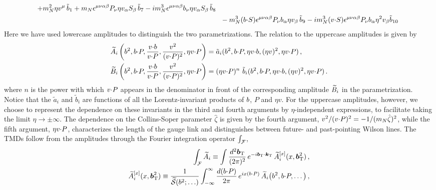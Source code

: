\begin{widetext}
\begin{align}
		~~+ m_N^2 \eta v^\mu\, \tilde b_1 
		+ m_N \epsilon^{\mu \nu \alpha \beta} P_\nu \eta v_\alpha S_\beta\, \tilde b_7  
		-  i m_N^3 \epsilon^{\mu \nu \alpha \beta} b_\nu \eta v_\alpha S_\beta\, \tilde b_8 \nonumber \\ &
		~~- m_N^3 (b {\cdot} S) \epsilon^{\mu \nu \alpha \beta} P_\nu b_\alpha \eta v_\beta\, \tilde b_9
		-i m_N^3 (v {\cdot} S) \epsilon^{\mu \nu \alpha \beta} P_\nu b_\alpha \eta^2 v_\beta \tilde b_{10}
\label{eq-phitildedecomp-lowere}
\end{align}
Here we have used lowercase amplitudes to distinguish the two parametrizations. The relation to the uppercase amplitudes is given by
\begin{align}
	\widetilde{A}_i\left(b^2,b {\cdot} P,\frac{v {\cdot} b}{v {\cdot} P}, \frac{v^2}{(v {\cdot} P)^2}, \eta v {\cdot} P\right) & = \tilde a_i(b^2,b {\cdot} P, \eta v {\cdot} b, (\eta v)^2, \eta v {\cdot} P)   \, , \nonumber \\
	 \widetilde{B}_i\left(b^2,b {\cdot} P,\frac{v {\cdot} b}{v {\cdot} P}, \frac{v^2}{(v {\cdot} P)^2}, \eta v {\cdot} P\right) & = (\eta v {\cdot} P)^n\ \tilde b_i(b^2,b {\cdot} P, \eta v {\cdot} b, (\eta v)^2, \eta v {\cdot} P)   \, .
	\label{eq-ab}
\end{align}
where $n$ is the power with which $v {\cdot} P$ appears in the denominator in front of the corresponding amplitude $\widetilde{B}_i$ in the parametrization. 
Notice that the $\tilde a_i$ and $\tilde b_i$ are functions of all the Lorentz-invariant products of $b$, $P$ and $\eta v$.
For the uppercase amplitudes, however, we choose to represent the dependence on these invariants in the third and fourth arguments by $\eta$-independent expressions, to facilitate taking the limit $\eta \rightarrow \pm \infty$. 
The dependence on the Collins-Soper parameter $\hat\zeta$ is given by the fourth argument, $v^2/(v {\cdot} P)^2 = - 1 /(m_N\hat\zeta)^2$, 
while the fifth argument, $\eta v {\cdot} P$, characterizes the length of the gauge link and distinguishes between future- and past-pointing
Wilson lines. 
The TMDs follow from the amplitudes through the Fourier integration operator $\int_\mathcal{F}$,
\begin{align}
	\fourint \tAmp_i \equiv \int \frac{d^2 \vprp{\bvec}}{(2\pi)^2}\,e^{-i\vprp{\bvec}\tcdot\vprp{\kei}}\, \tAmp^{[x]}_i(x,\vprp{\bvec}^2)\,, \label{eq-fourint} \\
	\tAmp^{[x]}_i(x,\vprp{\bvec}^2) \equiv \frac{1}{\widetilde{\mathcal{S}}(\bvec^2;\ldots)} \int_{-\infty}^{\infty} \frac{d(\bvec \tcdot P)}{2\pi}\, e^{ix(\bvec \tcdot P)}\, \tAmp_{i}\big(\bvec^2,\bvec \tcdot P,\ldots\big)\,, \nonumber

\end{align}
\end{widetext}
